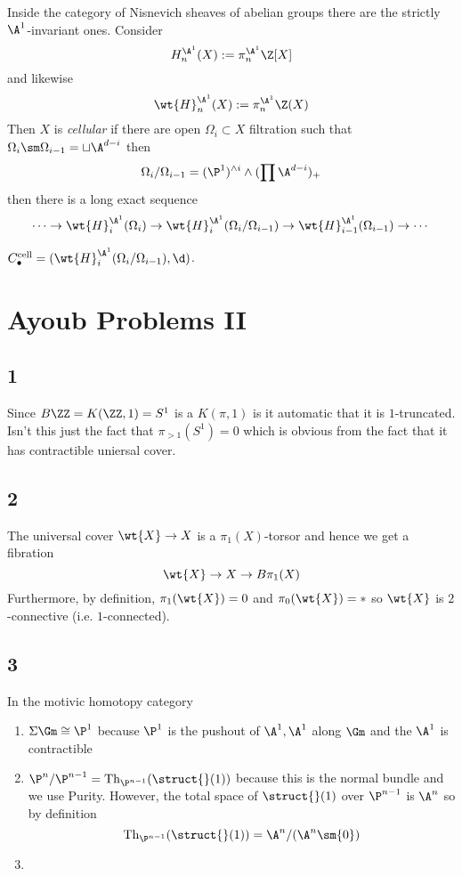 \documentclass{article}
\newcommand{\Th}{\mathrm{Th}}
\begin{document}
Inside the category of Nisnevich sheaves of abelian groups there are the strictly $\A^1$-invariant ones. Consider
\[ H_n^{\A^1}(X) := \pi_n^{\A^1} \Z[X] \]
and likewise
\[ \wt{H}^{\A^1}_n(X) := \pi_n^{\A^1} \Z(X) \]
Then $X$ is \textit{cellular} if there are open $\Omega_i \subset X$ filtration such that $\Omega_i \sm \Omega_{i-1} = \sqcup \A^{d-i}$ then
\[ \Omega_i / \Omega_{i-1} = (\P^1)^{\wedge i} \wedge (\prod \A^{d-i})_+ \]
then there is a long exact sequence
\[ \cdots \to \wt{H}^{\A^1}_i(\Omega_i) \to \wt{H}^{\A^1}_i(\Omega_i / \Omega_{i-1}) \to \wt{H}^{\A^1}_{i-1}(\Omega_{i-1}) \to \cdots \]

\begin{defn}
$C^{\text{cell}}_{\bullet} = (\wt{H}^{\A^1}_i(\Omega_i / \Omega_{i-1}), \d)$. 
\end{defn}

\section{Ayoub Problems II}

\subsection{1}

Since $B \ZZ = K(\ZZ, 1) = S^1$ is a $K(\pi,1)$ is it automatic that it is $1$-truncated. Isn't this just the fact that $\pi_{>1}(S^1) = 0$ which is obvious from the fact that it has contractible uniersal cover.

\subsection{2}

The universal cover $\wt{X} \to X$ is a $\pi_1(X)$-torsor and hence we get a fibration
\[ \wt{X} \to X \to B \pi_1(X) \]
Furthermore, by definition, $\pi_1(\wt{X}) = 0$ and $\pi_0(\wt{X}) = *$ so $\wt{X}$ is $2$-connective (i.e. $1$-connected). 

\subsection{3}

In the motivic homotopy category

\begin{enumerate}
\item $\Sigma \Gm \cong \P^1$ because $\P^1$ is the pushout of $\A^1, \A^1$ along $\Gm$ and the  $\A^1$ is contractible
\item $\P^n / \P^{n-1} = \Th_{\P^{n-1}}(\struct{}(1))$ because this is the normal bundle and we use Purity. However, the total space of $\struct{}(1)$ over $\P^{n-1}$ is $\A^n$ so by definition
\[ \Th_{\P^{n-1}}(\struct{}(1)) = \A^n / (\A^n \sm \{ 0 \}) \]
\item 
\end{enumerate} 
\end{document}
